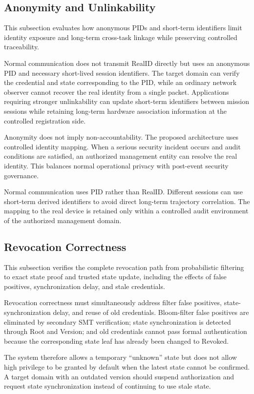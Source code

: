 \documentclass[lettersize,journal]{IEEEtran}
\begin{document}
	\subsection{Anonymity and Unlinkability}
	This subsection evaluates how anonymous PIDs and short-term identifiers limit identity exposure and long-term cross-task linkage while preserving controlled traceability.
	
	
	Normal communication does not transmit RealID directly but uses an anonymous PID and necessary short-lived session identifiers. The target domain can verify the credential and state corresponding to the PID, while an ordinary network observer cannot recover the real identity from a single packet. Applications requiring stronger unlinkability can update short-term identifiers between mission sessions while retaining long-term hardware association information at the controlled registration side.
	
	Anonymity does not imply non-accountability. The proposed architecture uses controlled identity mapping. When a serious security incident occurs and audit conditions are satisfied, an authorized management entity can resolve the real identity. This balances normal operational privacy with post-event security governance.
	
	Normal communication uses PID rather than RealID. Different sessions can use short-term derived identifiers to avoid direct long-term trajectory correlation. The mapping to the real device is retained only within a controlled audit environment of the authorized management domain.
	
	\subsection{Revocation Correctness}
	This subsection verifies the complete revocation path from probabilistic filtering to exact state proof and trusted state update, including the effects of false positives, synchronization delay, and stale credentials.
	
	
	Revocation correctness must simultaneously address filter false positives, state-synchronization delay, and reuse of old credentials. Bloom-filter false positives are eliminated by secondary SMT verification; state synchronization is detected through Root and Version; and old credentials cannot pass formal authentication because the corresponding state leaf has already been changed to Revoked.
	
	The system therefore allows a temporary ``unknown'' state but does not allow high privilege to be granted by default when the latest state cannot be confirmed. A target domain with an outdated version should suspend authorization and request state synchronization instead of continuing to use stale state.
	
\end{document}
